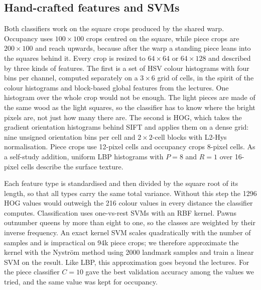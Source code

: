 
\subsection{Hand-crafted features and SVMs}

Both classifiers work on the square crops produced by the shared warp. Occupancy uses $100\times100$ crops centred on the square, while piece crops are $200\times100$ and reach upwards, because after the warp a standing piece leans into the squares behind it. Every crop is resized to $64\times64$ or $64\times128$ and described by three kinds of features. The first is a set of HSV colour histograms with four bins per channel, computed separately on a $3\times6$ grid of cells, in the spirit of the colour histograms and block-based global features from the lectures. One histogram over the whole crop would not be enough. The light pieces are made of the same wood as the light squares, so the classifier has to know where the bright pixels are, not just how many there are. The second is HOG, which takes the gradient orientation histograms behind SIFT and applies them on a dense grid: nine unsigned orientation bins per cell and $2\times2$-cell blocks with L2-Hys normalisation. Piece crops use 12-pixel cells and occupancy crops 8-pixel cells. As a self-study addition, uniform LBP histograms with $P=8$ and $R=1$ over 16-pixel cells describe the surface texture.

Each feature type is standardised and then divided by the square root of its length, so that all types carry the same total variance. Without this step the 1296 HOG values would outweigh the 216 colour values in every distance the classifier computes. Classification uses one-vs-rest SVMs with an RBF kernel. Pawns outnumber queens by more than eight to one, so the classes are weighted by their inverse frequency. An exact kernel SVM scales quadratically with the number of samples and is impractical on 94k piece crops; we therefore approximate the kernel with the Nystr\"om method using 2000 landmark samples and train a linear SVM on the result. Like LBP, this approximation goes beyond the lectures. For the piece classifier $C=10$ gave the best validation accuracy among the values we tried, and the same value was kept for occupancy.

